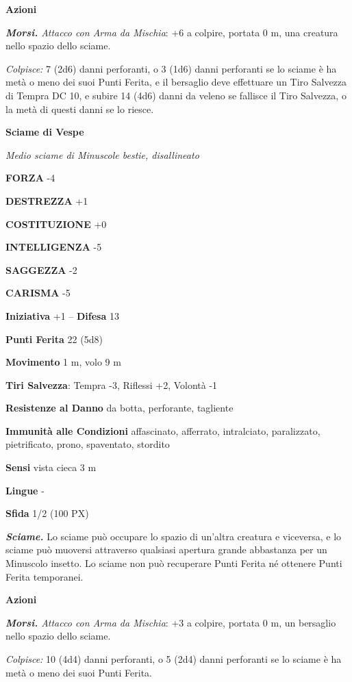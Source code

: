 \begin{multicols}{2}
\textbf{Azioni}

\textit{\textbf{Morsi.} Attacco con Arma da Mischia}: +6 a colpire, portata 0 m, una creatura nello spazio dello sciame.

\textit{Colpisce:} 7 (2d6) danni perforanti, o 3 (1d6) danni perforanti se lo sciame è ha metà o meno dei suoi Punti Ferita, e il bersaglio deve effettuare un Tiro Salvezza di Tempra DC 10, e subire 14 (4d6) danni da veleno se fallisce il Tiro Salvezza, o la metà di questi danni se lo riesce.

\medskip\textbf{Sciame di Vespe}

\textit{Medio sciame di Minuscole bestie, disallineato}

\textbf{FORZA} -4

\textbf{DESTREZZA} +1

\textbf{COSTITUZIONE} +0

\textbf{INTELLIGENZA} -5

\textbf{SAGGEZZA} -2

\textbf{CARISMA} -5

\textbf{Iniziativa} +1 -- \textbf{Difesa} 13

\textbf{Punti Ferita} 22 (5d8)

\textbf{Movimento} 1 m, volo 9 m

\textbf{Tiri Salvezza}: Tempra -3, Riflessi +2, Volontà -1

\textbf{Resistenze al Danno} da botta, perforante, tagliente

\textbf{Immunità alle Condizioni} affascinato, afferrato, intralciato, paralizzato, pietrificato, prono, spaventato, stordito

\textbf{Sensi} vista cieca 3 m

\textbf{Lingue} -

\textbf{Sfida} 1/2 (100 PX)

\textit{\textbf{Sciame.}} Lo sciame può occupare lo spazio di un'altra creatura e viceversa, e lo sciame può muoversi attraverso qualsiasi apertura grande abbastanza per un Minuscolo insetto. Lo sciame non può recuperare Punti Ferita né ottenere Punti Ferita temporanei.

\textbf{Azioni}

\textit{\textbf{Morsi.} Attacco con Arma da Mischia}: +3 a colpire, portata 0 m, un bersaglio nello spazio dello sciame.

\textit{Colpisce:} 10 (4d4) danni perforanti, o 5 (2d4) danni perforanti se lo sciame è ha metà o meno dei suoi Punti Ferita.


\end{multicols}
